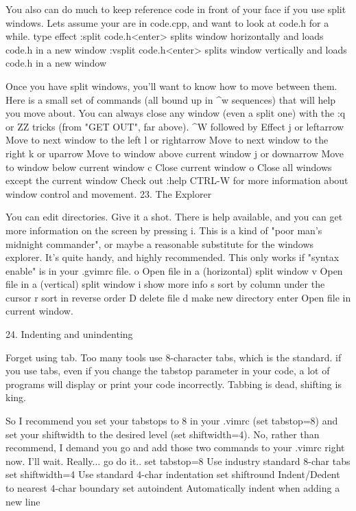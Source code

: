 \documentclass[a4paper, 12pt]{article}
\begin{document}
      You also can do much to keep reference code in front of your face if you use split windows. Lets assume your are in code.cpp, and want to look at code.h for a while.
      type	effect
      :split code.h<enter>	splits window horizontally and loads code.h in a new window
      :vsplit code.h<enter>	splits window vertically and loads code.h in a new window

      Once you have split windows, you'll want to know how to move between them. Here is a small set of commands (all bound up in ^w sequences) that will help you move about. You can always close any window (even a split one) with the :q or ZZ tricks (from "GET OUT", far above).
      ^W followed by	Effect
      j or leftarrow	Move to next window to the left
      l or rightarrow	Move to next window to the right
      k or uparrow	Move to window above current window
      j or downarrow	Move to window below current window
      c	Close current window
      o	Close all windows except the current window
      Check out :help CTRL-W for more information about window control and movement.
  23. The Explorer

      You can edit directories. Give it a shot. There is help available, and you can get more information on the screen by pressing i. This is a kind of "poor man's midnight commander", or maybe a reasonable substitute for the windows explorer. It's quite handy, and highly recommended. This only works if "syntax enable" is in your .gvimrc file.
      o	Open file in a (horizontal) split window	
      v	Open file in a (vertical) split window	
      i	show more info	
      s	sort by column under the cursor	
      r	sort in reverse order	
      D	delete file	
      d	make new directory	
      enter	Open file in current window.
      	
  24. Indenting and unindenting

      Forget using tab. Too many tools use 8-character tabs, which is the standard. if you use tabs, even if you change the tabstop parameter in your code, a lot of programs will display or print your code incorrectly. Tabbing is dead, shifting is king.

      So I recommend you set your tabstops to 8 in your .vimrc (set tabstop=8) and set your shiftwidth to the desired level (set shiftwidth=4). No, rather than recommend, I demand you go and add those two commands to your .vimrc right now. I'll wait. Really... go do it..
      set tabstop=8	Use industry standard 8-char tabs
      set shiftwidth=4	Use standard 4-char indentation
      set shiftround	Indent/Dedent to nearest 4-char boundary
      	set autoindent	Automatically indent when adding a new line
\end{document}

